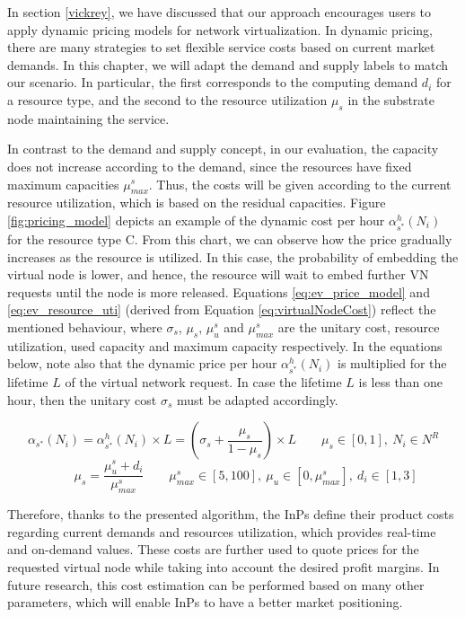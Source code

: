 In section \ref{vickrey}, we have discussed that our approach encourages users to apply dynamic pricing models for network virtualization. In dynamic pricing, there are many strategies to set flexible service costs based on current market demands. In this chapter, we will adapt the demand and supply labels to match our scenario. In particular, the first corresponds to the computing demand $d_i$ for a resource type, and the second to the resource utilization $\mu_s$ in the substrate node maintaining the service.

In contrast to the demand and supply concept, in our evaluation, the capacity does not increase according to the demand, since the resources have fixed maximum capacities $\mu^{s}_{max}$. Thus, the costs will be given according to the current resource utilization, which is based on the residual capacities. Figure \ref{fig:pricing_model} depicts an example of the dynamic cost per hour $\alpha^{h}_{s^{*}}(N_i)$ for the resource type C. From this chart, we can observe how the price gradually increases as the resource is utilized. In this case, the probability of embedding the virtual node is lower, and hence, the resource will wait to embed further VN requests until the node is more released. Equations \ref{eq:ev_price_model} and \ref{eq:ev_resource_uti} (derived from Equation \ref{eq:virtualNodeCost}) reflect the mentioned behaviour, where $\sigma_s$, $\mu_s$, $\mu^{s}_u$ and $\mu^{s}_{max}$ are the unitary cost, resource utilization, used capacity and maximum capacity respectively. In the equations below, note also that the dynamic price per hour $\alpha^{h}_{s^{*}}(N_i)$ is multiplied for the lifetime $L$ of the virtual network request. In case the lifetime $L$ is less than one hour, then the unitary cost $\sigma_s$ must be adapted accordingly.

  \begin{equation} \label{eq:ev_price_model}
	 \alpha_{s^{*}}(N_i) = \alpha^{h}_{s^{*}}(N_i) \times L =  (\sigma_s + \frac{\mu_s}{1 - \mu_s}) \times L \qquad \mu_s \in [0, 1], \ N_i \in N^R 
  \end{equation}
    \begin{equation} \label{eq:ev_resource_uti}
  \qquad \mu_s = \frac{\mu^{s}_u + d_i}{\mu^{s}_{max}} \qquad \mu^{s}_{max} \in [5,100], \ \mu_u \in [0, \mu^{s}_{max}] , \ d_i \in [1, 3]   
  \end{equation}

Therefore, thanks to the presented algorithm, the InPs define their product costs regarding current demands and resources utilization, which provides real-time and on-demand values. These costs are further used to quote prices for the requested virtual node while taking into account the desired profit margins. In future research, this cost estimation can be performed based on many other parameters, which will enable InPs to have a better market positioning.

